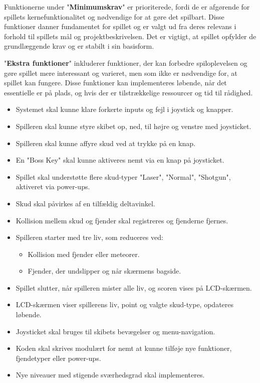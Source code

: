 Funktionerne under "\textbf{Minimumskrav}" er prioriterede, fordi de er afgørende for spillets kernefunktionalitet og nødvendige for at gøre det spilbart. Disse funktioner danner fundamentet for spillet og er valgt ud fra deres relevans i forhold til spillets mål og projektbeskrivelsen. Det er vigtigt, at spillet opfylder de grundlæggende krav og er stabilt i sin basisform.

"\textbf{Ekstra funktioner}" inkluderer funktioner, der kan forbedre spiloplevelsen og gøre spillet mere interessant og varieret, men som ikke er nødvendige for, at spillet kan fungere. Disse funktioner kan implementeres løbende, når det essentielle er på plads, og hvis der er tilstrækkelige ressourcer og tid til rådighed.

\begin{itemize}
    \item Systemet skal kunne klare forkerte inputs og fejl i joystick og knapper.
    \item Spilleren skal kunne styre skibet op, ned, til højre og venstre med joysticket.
    \item Spilleren skal kunne affyre skud ved at trykke på en knap.
    \item En "Boss Key" skal kunne aktiveres nemt via en knap på joysticket.
    \item Spillet skal understøtte flere skud-typer "Laser", "Normal", "Shotgun", aktiveret via power-ups.
    \item Skud skal påvirkes af en tilfældig deltavinkel.
    \item Kollision mellem skud og fjender skal registreres og fjenderne fjernes.
    \item Spilleren starter med tre liv, som reduceres ved:
    \begin{itemize}
        \item Kollision med fjender eller meteorer.
        \item Fjender, der undslipper og når skærmens bagside.
    \end{itemize}
    \item Spillet slutter, når spilleren mister alle liv, og scoren vises på LCD-skærmen.
    \item LCD-skærmen viser spillerens liv, point og valgte skud-type, opdateres løbende.
    \item Joysticket skal bruges til skibets bevægelser og menu-navigation.
    \item Koden skal skrives modulært for nemt at kunne tilføje nye funktioner, fjendetyper eller power-ups.
    \item Nye niveauer med stigende sværhedsgrad skal implementeres.
\end{itemize}